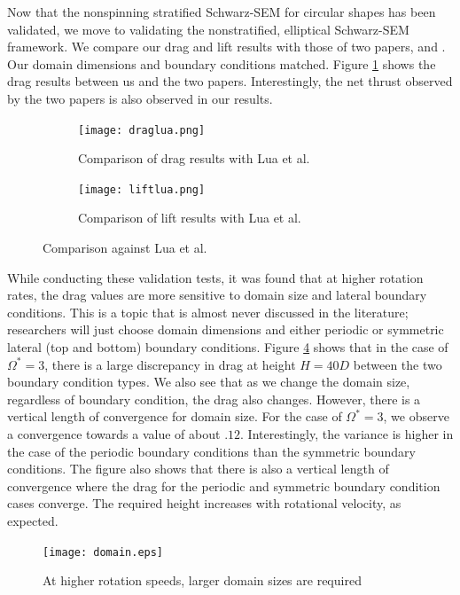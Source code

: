 Now that the nonspinning stratified Schwarz-SEM for circular shapes has been validated, we move to validating the nonstratified, elliptical Schwarz-SEM framework. We compare our drag and lift results with those of two papers, \cite{lu_flow_2018} and \cite{lua_rotating_2018}. Our domain dimensions and boundary conditions matched. Figure \ref{fig:lua drag} shows the drag results between us and the two papers. Interestingly, the net thrust observed by the two papers is also observed in our results.
\begin{figure}
    \centering
    \begin{subfigure}{0.49\textwidth}
    \texttt{[image: draglua.png]}
    \caption{Comparison of drag results with Lua et al.}
    \label{fig:lua drag}
    \end{subfigure}
    \begin{subfigure}{0.49\textwidth}
    \texttt{[image: liftlua.png]}
    \caption{Comparison of lift results with Lua et al.}
    \label{fig:lua lift}
    \end{subfigure}
    \caption{Comparison against Lua et al.}
    \label{fig:lua_com}
\end{figure}
While conducting these validation tests, it was found that at higher rotation rates, the drag values are more sensitive to domain size and lateral boundary conditions. This is a topic that is almost never discussed in the literature; researchers will just choose domain dimensions and either periodic or symmetric lateral (top and bottom) boundary conditions. Figure \ref{fig:domain_conv} shows that in the case of $\Omega^{\ast} = 3$, there is a large discrepancy in drag at height $H = 40D$ between the two boundary condition types. We also see that as we change the domain size, regardless of boundary condition, the drag also changes.  However, there is a vertical length of convergence for domain size. For the case of $\Omega^{\ast} = 3$, we observe a convergence towards a value of about $.12$. Interestingly, the variance is higher in the case of the periodic boundary conditions than the symmetric boundary conditions. The figure also shows that there is also a vertical length of convergence where the drag for the periodic and symmetric boundary condition cases converge. The required height increases with rotational velocity, as expected. 
\begin{figure}
    \centerline{\texttt{[image: domain.eps]}}
    \caption{At higher rotation speeds, larger domain sizes are required}
    \label{fig:domain_conv}
\end{figure}
